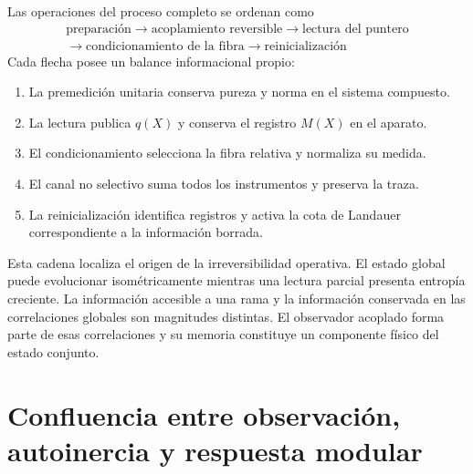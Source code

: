 Las operaciones del proceso completo se ordenan como
\begin{equation}
 \boxed{\begin{gathered}
 \text{preparaci\'on}
 \longrightarrow
 \text{acoplamiento reversible}
 \longrightarrow
 \text{lectura del puntero}\\
 \longrightarrow
 \text{condicionamiento de la fibra}
 \longrightarrow
 \text{reinicializaci\'on}
 \end{gathered}}
 \label{eq:rm-obs-measurement-chain}
\end{equation}
Cada flecha posee un balance informacional propio:
\begin{enumerate}[label=\textup{(\roman*)}]
 \item La premedici\'on unitaria conserva pureza y norma en el sistema
 compuesto.
 \item La lectura publica \(q(X)\) y conserva el registro \(M(X)\) en el
 aparato.
 \item El condicionamiento selecciona la fibra relativa y normaliza su
 medida.
 \item El canal no selectivo suma todos los instrumentos y preserva la
 traza.
 \item La reinicializaci\'on identifica registros y activa la cota de
 Landauer correspondiente a la informaci\'on borrada.
\end{enumerate}

Esta cadena localiza el origen de la irreversibilidad operativa. El estado
global puede evolucionar isom\'etricamente mientras una lectura parcial
presenta entrop\'ia creciente. La informaci\'on accesible a una rama y la
informaci\'on conservada en las correlaciones globales son magnitudes
distintas. El observador acoplado forma parte de esas correlaciones y su
memoria constituye un componente f\'isico del estado conjunto.

\section{Confluencia entre observaci\'on, autoinercia y respuesta modular}

